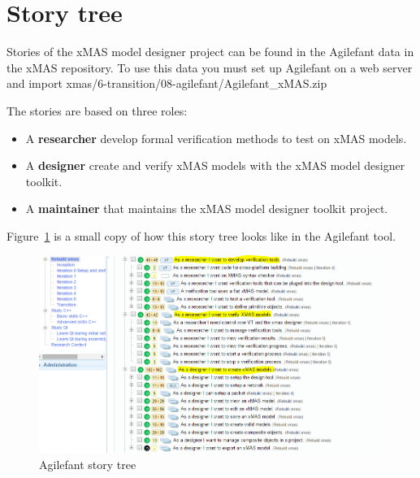 \section{Story tree}

Stories of the xMAS model designer project can be found in the Agilefant data in the xMAS repository.
To use this data you must set up Agilefant on a web server and import xmas/6-transition/08-agilefant/Agilefant\_xMAS.zip

The stories are based on three roles:
\begin{itemize}
\item A \textbf{researcher} develop formal verification methods to test on xMAS models.
\item A \textbf{designer} create and verify xMAS models with the xMAS model designer toolkit. 
\item A \textbf{maintainer} that maintains the xMAS model designer toolkit project. 
\end{itemize}

Figure~\ref{fig:story-tree} is a small copy of how this story tree looks like in the Agilefant tool.


\begin{figure}[here]
\begin{center}	
	\includegraphics[width=.70\linewidth]{pictures/story-tree}
	\caption{Agilefant story tree}
	\label{fig:story-tree}
\end{center}
\end{figure}

